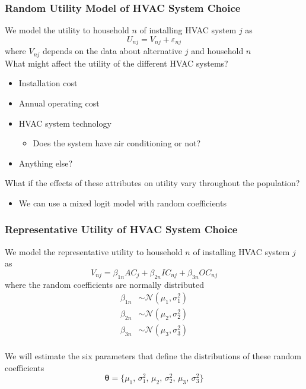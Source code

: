 \documentclass{beamer}\usepackage[]{graphicx}\usepackage[]{color}
\begin{document}
\begin{frame}\frametitle{Random Utility Model of HVAC System Choice}
    We model the utility to household $n$ of installing HVAC system $j$ as
    $$U_{nj} = V_{nj} + \varepsilon_{nj}$$
    where $V_{nj}$ depends on the data about alternative $j$ and household $n$ \\
    \vspace{2ex}
    What might affect the utility of the different HVAC systems?
	\begin{itemize}
		\item Installation cost
		\item Annual operating cost
		\item HVAC system technology
		\begin{itemize}
			\item Does the system have air conditioning or not?
		\end{itemize}
		\item Anything else?
	\end{itemize}
	\vspace{2ex}
	What if the effects of these attributes on utility vary throughout the population?
	\begin{itemize}
		\item We can use a mixed logit model with random coefficients
	\end{itemize}
\end{frame}

\begin{frame}\frametitle{Representative Utility of HVAC System Choice}
	We model the representative utility to household $n$ of installing HVAC system $j$ as
	$$V_{nj} = \beta_{1n} AC_j + \beta_{2n} IC_{nj} + \beta_{3n} OC_{nj}$$
	where the random coefficients are normally distributed
	\begin{align*}
		\beta_{1n} & \sim \mathcal{N}(\mu_1, \sigma_1^2) \\
		\beta_{2n} & \sim \mathcal{N}(\mu_2, \sigma_2^2) \\
		\beta_{3n} & \sim \mathcal{N}(\mu_3, \sigma_3^2)
	\end{align*} \\
	\vspace{3ex}
	We will estimate the six parameters that define the distributions of these random coefficients
	$$\bm{\theta} = \{ \text{$\mu_1$, $\sigma_1^2$, $\mu_2$, $\sigma_2^2$, $\mu_3$, $\sigma_3^2$} \}$$
\end{frame}
\end{document}
